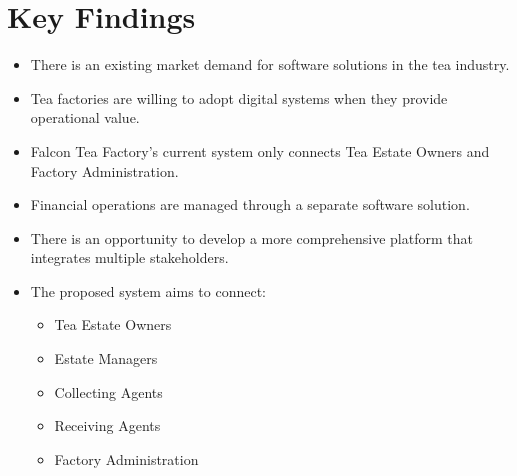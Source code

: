 \section*{Key Findings}
\begin{itemize}
  \item There is an existing market demand for software solutions in the tea industry.
  \item Tea factories are willing to adopt digital systems when they provide operational value.
  \item Falcon Tea Factory's current system only connects Tea Estate Owners and Factory Administration.
  \item Financial operations are managed through a separate software solution.
  \item There is an opportunity to develop a more comprehensive platform that integrates multiple stakeholders.
  \item The proposed system aims to connect:
  \begin{itemize}
    \item Tea Estate Owners
    \item Estate Managers
    \item Collecting Agents
    \item Receiving Agents
    \item Factory Administration
  \end{itemize}
\end{itemize}
